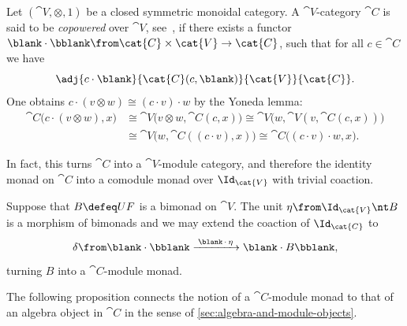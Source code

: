 \begin{example}\label{ex:copower-as-comodule-monad}
  Let \((\cat{V}, \otimes, 1)\) be a closed symmetric monoidal category.
  A \(\cat{V}\)\hyp{}category \(\cat{C}\)
  is said to be \emph{copowered}
  over \(\cat{V}\),
  see~\cite[Section~3.7]{kelly05:basic},
  if there exists a functor \(\blank \cdot \bblank \from \cat{C} \times \cat{V} \to \cat{C}\),
  such that for all \(c \in \cat{C}\) we have
  \[
    \adj{c \cdot \blank}{\cat{C}(c, \blank)}{\cat{V}}{\cat{C}}.
  \]
  One obtains \(c\cdot (v \otimes w) \cong (c\cdot v) \cdot w\) by the Yoneda lemma:
  \begin{align*}
    \cat{C}\big(c \cdot (v \otimes w), x\big)
    & \cong \cat{V}\big(v \otimes w, \cat{C}(c, x)\big)
      \cong \cat{V}\big(w, \cat{V}(v, \cat{C}(c, x))\big) \\
    & \cong \cat{V}\big(w ,\cat{C}((c \cdot v), x)\big)
      \cong \cat{C}\big((c \cdot v)\cdot w, x\big).
  \end{align*}

  In fact, this turns \(\cat{C}\) into a \(\cat{V}\)\hyp{}module category,
  and therefore the identity monad on \(\cat{C}\) into a comodule monad over \(\Id_{\cat{V}}\) with trivial coaction.

  Suppose that \(B \defeq UF\) is a bimonad on \(\cat{V}\).
  The unit \(\eta \from \Id_{\cat{V}} \nt B\) is a morphism of bimonads and we may extend the coaction of \(\Id_{\cat{C}}\) to
  \[
    \delta\from \blank \cdot \bblank \xrightarrow{\; \blank \,\cdot\, \eta\;} \blank \cdot B\bblank,
  \]
  turning \(B\) into a \(\cat{C}\)-module monad.
\end{example}

The following proposition connects
the notion of a \(\cat{C}\)\hyp{}module monad
to that of an algebra object in \(\cat{C}\) in the sense of \cref{sec:algebra-and-module-objects}.

